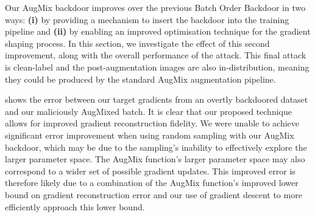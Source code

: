 Our AugMix backdoor improves over the previous Batch Order Backdoor in two ways: \textbf{(i)} by providing a mechanism to insert the backdoor into the training pipeline and \textbf{(ii)} by enabling an improved optimisation technique for the gradient shaping process. In this section, we investigate the effect of this second improvement, along with the overall performance of the attack. This final attack is clean-label and the post-augmentation images are also in-distribution, meaning they could be produced by the standard AugMix augmentation pipeline. 

 shows the error between our target gradients from an overtly backdoored dataset and our maliciously AugMixed batch. It is clear that our proposed technique allows for improved gradient reconstruction fidelity. We were unable to achieve significant error improvement when using random sampling with our AugMix backdoor, which may be due to the sampling's inability to effectively explore the larger parameter space. The AugMix function's larger parameter space may also correspond to a wider set of possible gradient updates. This improved error is therefore likely due to a combination of the AugMix function's improved lower bound on gradient reconstruction error and our use of gradient descent to more efficiently approach this lower bound.

\begin{table}[!t]
\centering
\caption{Percentage accuracies of classifiers trained on CIFAR10 using our backdoored AugMix function. The trigger we inserted was the flag-like trigger described by \cite{bob}. We performed 200 iterations with Adam optimiser using $\beta=(0.99, 0.999)$ and $1\times10^{-3}$ learning rate to find the AugMix parameters. Following the setup described by \cite{bob}, we initially trained each classifier for 10 clean epochs, followed by 10 adversarially AugMixed batches. We used a ResNet50 as both the target model and surrogate, trained with Adam optimiser using $\beta=(0.99, 0.999)$ and $1\times10^{-3}$ learning rate.}
\label{tab:augmix}
\vspace{-10pt}
\end{table}


